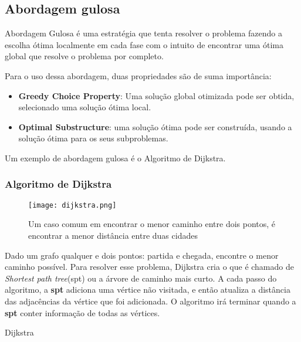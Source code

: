 \subsection{Abordagem gulosa}

    Abordagem Gulosa é uma estratégia que tenta resolver o problema fazendo a 
    escolha ótima localmente em cada fase com o intuito de encontrar 
    uma ótima global que resolve o problema por completo.

    Para o uso dessa abordagem, duas propriedades são de suma importância: 

    \begin{itemize}
        \item \textbf{Greedy Choice Property}: Uma solução global otimizada pode ser obtida,
        selecionado uma solução ótima local.
        \item \textbf{Optimal Substructure}: uma solução ótima pode ser construída, 
        usando a solução ótima para os seus subproblemas.
    \end{itemize}

    Um exemplo de abordagem gulosa é o Algoritmo de Dijkstra.

    \subsubsection{Algoritmo de Dijkstra}

    \begin{figure}[ht]
        \centering
        \texttt{[image: dijkstra.png]}
        \caption{Um caso comum em encontrar o menor caminho entre dois pontos, é encontrar 
        a menor distância entre duas cidades}
        \label{fig:dikstra}
    \end{figure}

    Dado um grafo qualquer e dois pontos: partida e chegada, encontre o menor caminho possível.
    Para resolver esse problema, Dijkstra cria o que é chamado de \emph{Shortest path tree}(spt) ou 
    a árvore de caminho mais curto. A cada passo do algoritmo, a \textbf{spt} adiciona uma vértice não visitada,
    e então atualiza a distância das adjacências da vértice que foi adicionada. O algoritmo irá terminar quando 
    a \textbf{spt} conter informação de todas as vértices.

    \begin{algorithm}
        \caption{Dijkstra} 
        \begin{algorithmic}[1]
        \EndFor
        \EndFor
        \EndFor
        \EndProcedure
        \end{algorithmic}
    \end{algorithm}

